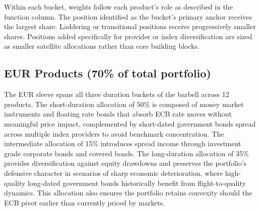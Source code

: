 \documentclass[11pt,a4paper]{article}
\begin{document}
Within each bucket, weights follow each product's role as described in the function column. The position identified as the bucket's primary anchor receives the largest share. Laddering or transitional positions receive progressively smaller shares. Positions added specifically for provider or index diversification are sized as smaller satellite allocations rather than core building blocks.

\subsection{EUR Products (70\% of total portfolio)}

The EUR sleeve spans all three duration buckets of the barbell across 12 products. The short-duration allocation of 50\% is composed of money market instruments and floating rate bonds that absorb ECB rate moves without meaningful price impact, complemented by short-dated government bonds spread across multiple index providers to avoid benchmark concentration. The intermediate allocation of 15\% introduces spread income through investment grade corporate bonds and covered bonds. The long-duration allocation of 35\% provides diversification against equity drawdowns and preserves the portfolio's defensive character in scenarios of sharp economic deterioration, where high-quality long-dated government bonds historically benefit from flight-to-quality dynamics. This allocation also ensures the portfolio retains convexity should the ECB pivot earlier than currently priced by markets.
\end{document}
